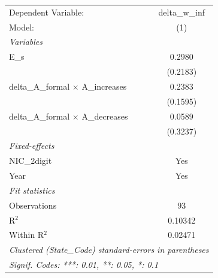 
\begingroup
\centering
\begin{tabular}{lc}
   \tabularnewline \midrule \midrule
   Dependent Variable:                        & delta\_w\_inf\\    
   Model:                                     & (1)\\  
   \midrule
   \emph{Variables}\\
   E\_s                                       & 0.2980\\   
                                              & (0.2183)\\   
   delta\_A\_formal $\times$ A\_increases     & 0.2383\\   
                                              & (0.1595)\\   
   delta\_A\_formal $\times$ A\_decreases     & 0.0589\\   
                                              & (0.3237)\\   
   \midrule
   \emph{Fixed-effects}\\
   NIC\_2digit                                & Yes\\  
   Year                                       & Yes\\  
   \midrule
   \emph{Fit statistics}\\
   Observations                               & 93\\  
   R$^2$                                      & 0.10342\\  
   Within R$^2$                               & 0.02471\\  
   \midrule \midrule
   \multicolumn{2}{l}{\emph{Clustered (State\_Code) standard-errors in parentheses}}\\
   \multicolumn{2}{l}{\emph{Signif. Codes: ***: 0.01, **: 0.05, *: 0.1}}\\
\end{tabular}
\par\endgroup


